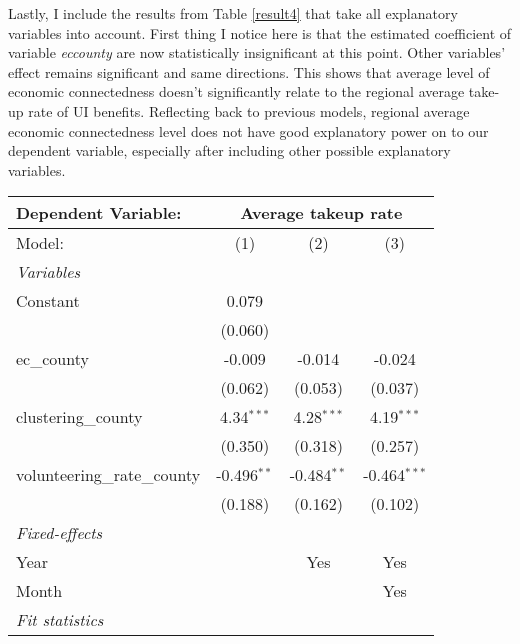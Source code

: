 \documentclass{article}
\begin{document}
Lastly, I include the results from Table \ref{result4} that take all explanatory variables into account. First thing I notice here is that the estimated coefficient of variable \textit{ec\textunderscore county} are now statistically insignificant at this point. Other variables' effect remains significant and same directions. This shows that average level of economic connectedness doesn't significantly relate to the regional average take-up rate of UI benefits. Reflecting back to previous models, regional average economic connectedness level does not have good explanatory power on to our dependent variable, especially after including other possible explanatory variables.

    
\begin{table}[h!]
   \centering
   \begin{tabular}{lccc}
      \tabularnewline \midrule \midrule
      Dependent Variable:  & \multicolumn{3}{c}{Average takeup rate}\\
      \hline
      Model:                       & (1)            & (2)            & (3)\\  
      \midrule
      \emph{Variables}\\
      Constant                     & 0.079          &                &   \\   
                                   & (0.060)        &                &   \\   
      ec\_county                   & -0.009         & -0.014         & -0.024\\   
                                   & (0.062)        & (0.053)        & (0.037)\\   
      clustering\_county           & 4.34$^{***}$   & 4.28$^{***}$   & 4.19$^{***}$\\   
                                   & (0.350)        & (0.318)        & (0.257)\\   
      volunteering\_rate\_county   & -0.496$^{**}$ & -0.484$^{**}$ & -0.464$^{***}$\\   
                                   & (0.188)        & (0.162)        & (0.102)\\   
      \midrule
      \emph{Fixed-effects}\\
      Year                         &                & Yes            & Yes\\  
      Month                        &                &                & Yes\\  
      \midrule
      \emph{Fit statistics}\\

\end{tabular}
\end{table}
\end{document}
